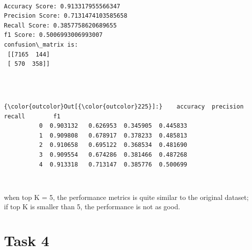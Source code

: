 \documentclass[11pt]{article}
\begin{document}
   

    \begin{center}
    \end{center}
    { \hspace*{\fill} \\}
    


    \begin{Verbatim}[commandchars=\\\{\}]
Accuracy Score: 0.913317955566347
Precision Score: 0.7131474103585658
Recall Score: 0.3857758620689655
f1 Score: 0.5006993006993007
confusion\_matrix is: 
 [[7165  144]
 [ 570  358]] 


    \end{Verbatim}

   

    \begin{center}
    \end{center}
    { \hspace*{\fill} \\}
    
\begin{Verbatim}[commandchars=\\\{\}]
{\color{outcolor}Out[{\color{outcolor}225}]:}    accuracy  precision    recall        f1
          0  0.903132   0.626953  0.345905  0.445833
          1  0.909808   0.678917  0.378233  0.485813
          2  0.910658   0.695122  0.368534  0.481690
          3  0.909554   0.674286  0.381466  0.487268
          4  0.913318   0.713147  0.385776  0.500699
\end{Verbatim}
            
    \begin{center}
    \end{center}
    { \hspace*{\fill} \\}
    
    when top K = 5, the performance metrics is quite similar to the original
dataset; if top K is smaller than 5, the performance is not as good.

    \section*{Task 4}\label{task-4}
\end{document}
